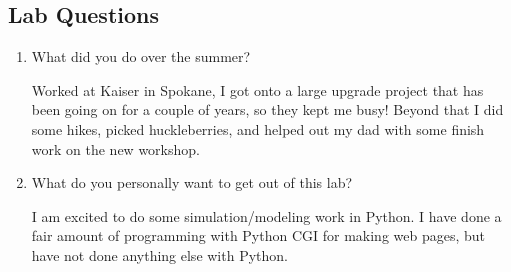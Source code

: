 \documentclass{article}
\begin{document}

\begin{flushleft}\section{Lab Questions}
\end{flushleft}
\begin{enumerate}
    \item What did you do over the summer?\par
    Worked at Kaiser in Spokane, I got onto a large upgrade project that has been going on for a couple of years, so they kept me busy! Beyond that I did some hikes, picked huckleberries, and helped out my dad with some finish work on the new workshop.
    \item What do you personally want to get out of this lab?\par
    I am excited to do some simulation/modeling work in Python. I have done a fair amount of programming with Python CGI for making web pages, but have not done anything else with Python.
\end{enumerate}
\end{document}
